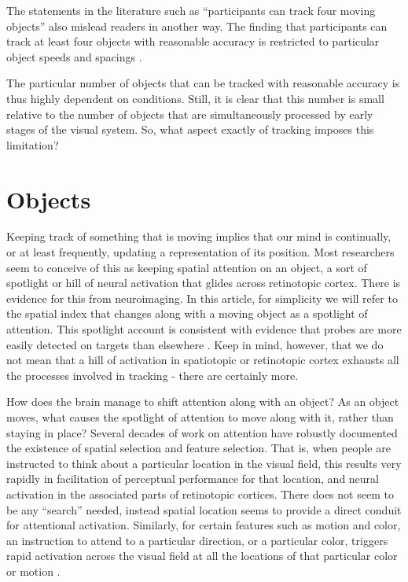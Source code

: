\documentclass[]{book}
\begin{document}
The statements in the literature such as ``participants can track four moving objects'' also mislead readers in another way. The finding that participants can track at least four objects with reasonable accuracy is restricted to particular object speeds \citep{alvarezHowManyObjects2007, holcombeExhaustingAttentionalTracking2012} and spacings \citep{franconeriEvidenceSpeedLimit2008, holcombeObjectTrackingAbsence2014}.

The particular number of objects that can be tracked with reasonable accuracy is thus highly dependent on conditions. Still, it is clear that this number is small relative to the number of objects that are simultaneously processed by early stages of the visual system. So, what aspect exactly of tracking imposes this limitation?

\hypertarget{objects}{%
\chapter{Objects}\label{objects}}

Keeping track of something that is moving implies that our mind is continually, or at least frequently, updating a representation of its position. Most researchers seem to conceive of this as keeping spatial attention on an object, a sort of spotlight or hill of neural activation that glides across retinotopic cortex. There is evidence for this from neuroimaging. In this article, for simplicity we will refer to the spatial index that changes along with a moving object as a spotlight of attention. This spotlight account is consistent with evidence that probes are more easily detected on targets than elsewhere \citep{pylyshynPuzzlingFindingsMultiple2006, searsMultipleObjectTracking2000}. Keep in mind, however, that we do not mean that a hill of activation in spatiotopic or retinotopic cortex exhausts all the processes involved in tracking - there are certainly more.

How does the brain manage to shift attention along with an object? As an object moves, what causes the spotlight of attention to move along with it, rather than staying in place? Several decades of work on attention have robustly documented the existence of spatial selection and feature selection. That is, when people are instructed to think about a particular location in the visual field, this results very rapidly in facilitation of perceptual performance for that location, and neural activation in the associated parts of retinotopic cortices. There does not seem to be any ``search'' needed, instead spatial location seems to provide a direct conduit for attentional activation. Similarly, for certain features such as motion and color, an instruction to attend to a particular direction, or a particular color, triggers rapid activation across the visual field at all the locations of that particular color or motion \citep{saenzGlobalFeaturebasedAttention2003, whiteFeaturebasedAttentionInvoluntarily2011}.
\end{document}
